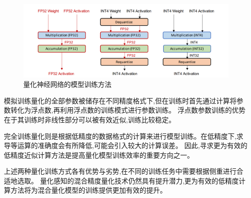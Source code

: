 \begin{center}
    \begin{figure}[ht!]
        \centering
        \includegraphics[scale = 0.5]{figures/differentLPmethods.png}
        \caption{量化神经网络的模型训练方法}
        \label{fig:differentlpmethods}
    \end{figure}
\end{center}


模拟训练量化的全部参数被储存在不同精度格式下,但在训练时首先通过计算将参数转化为浮点数,再利用浮点数的训练模式进行参数训练。
浮点数参数训练的优势在于其训练时非线性部分可以被有效近似,训练比较稳定。

完全训练量化则是根据低精度的数据格式的计算来进行模型训练。在低精度下,求导等运算的准确度会有所降低,可能会引入较大的计算误差。
因此,寻求更为有效的低精度近似计算方法是提高量化模型训练效率的重要方向之一。

上述两种量化训练方式各有优势与劣势,在不同的训练任务中需要根据侧重进行合适地选取。
量化感知的混合精度量化技术仍然具有提升潜力,更为有效的低精度计算方法将为混合量化模型的训练提供更加有效的提升。